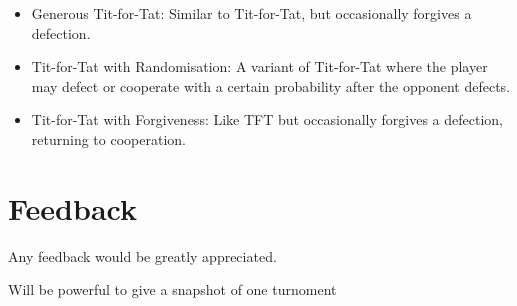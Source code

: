 \documentclass[11pt,preprint]{elsarticle}
\numberwithin{equation}{section}
\numberwithin{figure}{section}
\numberwithin{table}{section}
\begin{document}
\begin{itemize}
\item
  Generous Tit-for-Tat: Similar to Tit-for-Tat, but occasionally
  forgives a defection.
\item
  Tit-for-Tat with Randomisation: A variant of Tit-for-Tat where the
  player may defect or cooperate with a certain probability after the
  opponent defects.
\item
  Tit-for-Tat with Forgiveness: Like TFT but occasionally forgives a
  defection, returning to cooperation.
\end{itemize}

\section{Feedback}\label{feedback}

Any feedback would be greatly appreciated.

Will be powerful to give a snapshot of one turnoment

\newpage

\begin{landscape}







\end{landscape}
\end{document}
